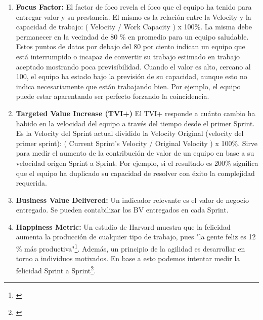 \begin{enumerate}
{\begin{enumerate}
  \end{enumerate}

Cuando se definió el marco de trabajo, como algo mínimo de cosas para que funcione, se dejó lo más simple posible. Debido a ello, el concepto de Velocity sí es partes del marco de trabajo, pero Working capacity no lo es, aunque es ampliamente usado \footnote{Erich Buhler, Agilib.org 2015, Proyecto Mercury 2015 (LAN), \cite{Erich-Buhler-Coach-2015}.}.
}

\item {\textbf{Focus Factor:} El factor de foco revela el foco que el equipo ha tenido para entregar valor y su prestancia. El mismo es la relación entre la Velocity y la capacidad de trabajo: ( Velocity / Work Capacity ) x 100\%. La misma debe permanecer en la vecindad de 80 \% en promedio para un equipo saludable. Estos puntos de datos por debajo del 80 por ciento indican un equipo que está interrumpido o incapaz de convertir su trabajo estimado en trabajo aceptado mostrando poca previsibilidad. Cuando el valor es alto, cercano al 100, el equipo ha estado bajo la previsión de su capacidad, aunque esto no indica necesariamente que están trabajando bien. Por ejemplo, el equipo puede estar aparentando ser perfecto forzando la coincidencia.}

\item {\textbf{Targeted Value Increase (TVI+)} El TVI+ responde a cuánto cambio ha habido en la velocidad del equipo a través del tiempo desde el primer Sprint. Es la Velocity del Sprint actual dividido la Velocity Original (velocity del primer sprint): ( Current Sprint’s Velocity / Original Velocity ) x 100\%. Sirve para medir el aumento de la contribución de valor de un equipo en base a su velocidad origen Sprint a Sprint.
Por ejemplo, si el resultado es 200\% significa que el equipo ha duplicado su capacidad de resolver con éxito la complejidad requerida.
}


\item {\textbf{Business Value Delivered:}
Un indicador relevante es el valor de negocio entregado. Se pueden contabilizar los BV entregados en cada Sprint.
}

\item {\textbf{Happiness Metric:}
Un estudio de Harvard muestra que la felicidad aumenta la producción de cualquier tipo de trabajo, pues "la gente feliz es 12 \% más productiva"\footnote{\cite{U-K-University-2014}}. Además, un principio de la agilidad es desarrollar en torno a individuos motivados. En base a esto podemos intentar medir la felicidad Sprint a Sprint\footnote{\cite{Jeff-2014}}. 

}
\end{enumerate}
